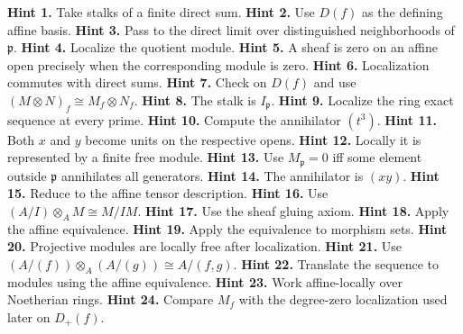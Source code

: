 \textbf{Hint 1.} Take stalks of a finite direct sum.
\textbf{Hint 2.} Use $D(f)$ as the defining affine basis.
\textbf{Hint 3.} Pass to the direct limit over distinguished neighborhoods of $\mathfrak p$.
\textbf{Hint 4.} Localize the quotient module.
\textbf{Hint 5.} A sheaf is zero on an affine open precisely when the corresponding module is zero.
\textbf{Hint 6.} Localization commutes with direct sums.
\textbf{Hint 7.} Check on $D(f)$ and use $(M\otimes N)_f\cong M_f\otimes N_f$.
\textbf{Hint 8.} The stalk is $I_{\mathfrak p}$.
\textbf{Hint 9.} Localize the ring exact sequence at every prime.
\textbf{Hint 10.} Compute the annihilator $(t^3)$.
\textbf{Hint 11.} Both $x$ and $y$ become units on the respective opens.
\textbf{Hint 12.} Locally it is represented by a finite free module.
\textbf{Hint 13.} Use $M_{\mathfrak p}=0$ iff some element outside $\mathfrak p$ annihilates all generators.
\textbf{Hint 14.} The annihilator is $(xy)$.
\textbf{Hint 15.} Reduce to the affine tensor description.
\textbf{Hint 16.} Use $(A/I)\otimes_A M\cong M/IM$.
\textbf{Hint 17.} Use the sheaf gluing axiom.
\textbf{Hint 18.} Apply the affine equivalence.
\textbf{Hint 19.} Apply the equivalence to morphism sets.
\textbf{Hint 20.} Projective modules are locally free after localization.
\textbf{Hint 21.} Use $(A/(f))\otimes_A(A/(g))\cong A/(f,g)$.
\textbf{Hint 22.} Translate the sequence to modules using the affine equivalence.
\textbf{Hint 23.} Work affine-locally over Noetherian rings.
\textbf{Hint 24.} Compare $M_f$ with the degree-zero localization used later on $D_+(f)$.
